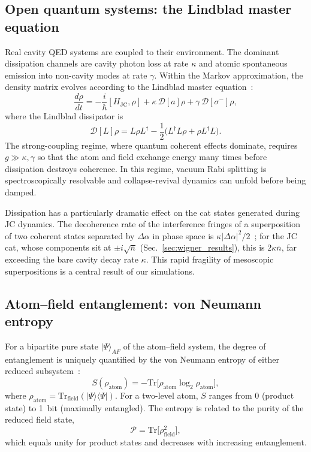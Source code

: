 \documentclass{iopjournal}
\begin{document}
\subsection{Open quantum systems: the Lindblad master equation}
\label{sec:lindblad}

Real cavity QED systems are coupled to their environment. The dominant dissipation channels are cavity photon loss at rate $\kappa$ and atomic spontaneous emission into non-cavity modes at rate $\gamma$. Within the Markov approximation, the density matrix evolves according to the Lindblad master equation~\cite{lindblad1976, wiseman2009}:
\begin{equation}
\frac{d\rho}{dt} = -\frac{i}{\hbar}[H_{\text{JC}}, \rho] + \kappa\, \mathcal{D}[a]\rho + \gamma\, \mathcal{D}[\sigma^-]\rho,
\label{eq:lindblad}
\end{equation}
where the Lindblad dissipator is
\begin{equation}
\mathcal{D}[L]\rho = L\rho L^\dagger - \frac{1}{2}\big(L^\dagger L \rho + \rho L^\dagger L\big).
\label{eq:dissipator}
\end{equation}
The strong-coupling regime, where quantum coherent effects dominate, requires $g \gg \kappa, \gamma$ so that the atom and field exchange energy many times before dissipation destroys coherence. In this regime, vacuum Rabi splitting is spectroscopically resolvable and collapse-revival dynamics can unfold before being damped.

Dissipation has a particularly dramatic effect on the cat states generated during JC dynamics. The decoherence rate of the interference fringes of a superposition of two coherent states separated by $\Delta\alpha$ in phase space is $\kappa|\Delta\alpha|^2/2$~\cite{zurek2003, haroche2006}; for the JC cat, whose components sit at $\pm i\sqrt{\bar{n}}$ (Sec.~\ref{sec:wigner_results}), this is $2\kappa\bar{n}$, far exceeding the bare cavity decay rate $\kappa$. This rapid fragility of mesoscopic superpositions is a central result of our simulations.


\subsection{Atom--field entanglement: von Neumann entropy}
\label{sec:entropy_theory}

For a bipartite pure state $|\Psi\rangle_{AF}$ of the atom--field system, the degree of entanglement is uniquely quantified by the von Neumann entropy of either reduced subsystem~\cite{nielsen2000}:
\begin{equation}
S(\rho_{\text{atom}}) = -\text{Tr}\big[\rho_{\text{atom}} \log_2 \rho_{\text{atom}}\big],
\label{eq:entropy}
\end{equation}
where $\rho_{\text{atom}} = \text{Tr}_{\text{field}}(|\Psi\rangle\langle\Psi|)$. For a two-level atom, $S$ ranges from 0 (product state) to 1~bit (maximally entangled). The entropy is related to the purity of the reduced field state,
\begin{equation}
\mathcal{P} = \text{Tr}\big[\rho_{\text{field}}^2\big],
\label{eq:purity}
\end{equation}
which equals unity for product states and decreases with increasing entanglement.
\end{document}
